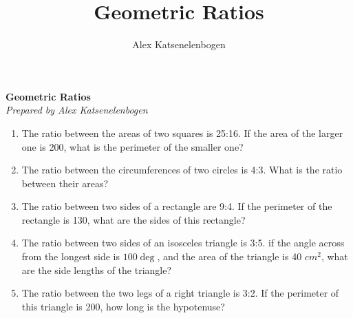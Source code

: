 \documentclass{article}
\title{Geometric Ratios}
\author{Alex Katsenelenbogen}
\begin{document}
\begin{center}
      \Large\textbf{Geometric Ratios}\\
      \large\textit{Prepared by Alex Katsenelenbogen}
   \end{center}

\begin{enumerate}


\item The ratio between the areas of two squares is 25:16. If the area of the larger one is 200, what is the perimeter of the smaller one?

\item The ratio between the circumferences of two circles is 4:3. What is the ratio between their
areas?

\item The ratio between two sides of a rectangle are 9:4. If the perimeter of the rectangle is 130, what are the sides of this rectangle?

\item
The ratio between two sides of an isosceles triangle is 3:5. if the angle across
from the longest side is $100 \deg$, and the area of the triangle is 40 $cm^{2}$,
what are the side lengths of the triangle?

\item The ratio between the two legs of a right triangle is 3:2. If the perimeter of this
triangle is 200, how long is the hypotenuse?

\end{enumerate}
\end{document}
